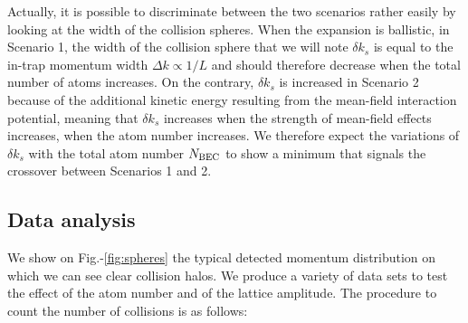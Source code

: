 Actually, it is possible to discriminate between the two scenarios rather easily by looking at the width of the collision spheres. When the expansion is ballistic, \ie in Scenario 1, the width of the collision sphere that we will note $\delta k_s$ is equal to the in-trap momentum width $\Delta k \propto 1/L$ and should therefore decrease when the total number of atoms increases. On the contrary, $\delta k_s$ is increased in Scenario 2 because of the additional kinetic energy resulting from the mean-field interaction potential, meaning that $\delta k_s$ increases when the strength of mean-field effects increases, \ie when the atom number increases. We therefore expect the variations of $\delta k_s$ with the total atom number $N_{\rm{BEC}}$ to show a minimum that signals the crossover between Scenarios 1 and 2.

\subsection{Data analysis}

We show on Fig.-\ref{fig:spheres} the typical detected momentum distribution on which we can see clear collision halos. We produce a variety of data sets to test the effect of the atom number and of the lattice amplitude. The procedure to count the number of collisions is as follows:


